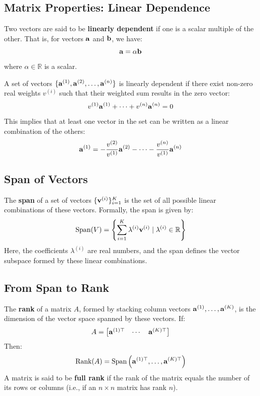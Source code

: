 \subsection{Matrix Properties: Linear Dependence}

Two vectors are said to be \textbf{linearly dependent} if one is a scalar multiple of the other. That is, for vectors \( \mathbf{a} \) and \( \mathbf{b} \), we have:
\begin{equation}
    \mathbf{a} = \alpha \mathbf{b}
\end{equation}
where \( \alpha \in \mathbb{R} \) is a scalar.

A set of vectors \( \{ \mathbf{a}^{(1)}, \mathbf{a}^{(2)}, \dots, \mathbf{a}^{(n)} \} \) is linearly dependent if there exist non-zero real weights \( v^{(i)} \) such that their weighted sum results in the zero vector:
\begin{equation}
    v^{(1)} \mathbf{a}^{(1)} + \dots + v^{(n)} \mathbf{a}^{(n)} = 0
\end{equation}
This implies that at least one vector in the set can be written as a linear combination of the others:
\begin{equation}
    \mathbf{a}^{(1)} = - \frac{v^{(2)}}{v^{(1)}} \mathbf{a}^{(2)} - \dots - \frac{v^{(n)}}{v^{(1)}} \mathbf{a}^{(n)}
\end{equation}

\subsection{Span of Vectors}

The \textbf{span} of a set of vectors \( \{ \mathbf{v}^{(i)} \}_{i=1}^{K} \) is the set of all possible linear combinations of these vectors. Formally, the span is given by:
\begin{equation}
    \text{Span}(V) = \left\{ \sum_{i=1}^{K} \lambda^{(i)} \mathbf{v}^{(i)} \mid \lambda^{(i)} \in \mathbb{R} \right\}
\end{equation}
Here, the coefficients \( \lambda^{(i)} \) are real numbers, and the span defines the vector subspace formed by these linear combinations.

\subsection{From Span to Rank}

The \textbf{rank} of a matrix \( A \), formed by stacking column vectors \( \mathbf{a}^{(1)}, \dots, \mathbf{a}^{(K)} \), is the dimension of the vector space spanned by these vectors. If:
\begin{equation}
    A = \begin{bmatrix} \mathbf{a}^{(1)\top} & \cdots & \mathbf{a}^{(K)\top} \end{bmatrix}
\end{equation}
Then:
\begin{equation}
    \text{Rank}(A) = \text{Span}\left( \mathbf{a}^{(1)\top}, \dots, \mathbf{a}^{(K)\top} \right)
\end{equation}
A matrix is said to be \textbf{full rank} if the rank of the matrix equals the number of its rows or columns (i.e., if an \( n \times n \) matrix has rank \( n \)).


